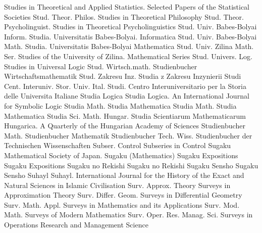 {Studies in Theoretical and Applied Statistics. Selected Papers of the Statistical Societies}
{Stud. Theor. Philos.}
{Studies in Theoretical Philosophy}
{Stud. Theor. Psycholinguist.}
{Studies in Theoretical Psycholinguistics}
{Stud. Univ. Babes-Bolyai Inform.}
{Studia. Universitatis Babes-Bolyai. Informatica}
{Stud. Univ. Babes-Bolyai Math.}
{Studia. Universitatis Babes-Bolyai Mathematica}
{Stud. Univ. Zilina Math. Ser.}
{Studies of the University of Zilina. Mathematical Series}
{Stud. Univers. Log.}
{Studies in Universal Logic}
{Stud. Wirtsch.math.}
{Studienbucher Wirtschaftsmathematik}
{Stud. Zakresu Inz.}
{Studia z Zakresu Inzynierii}
{Studi Cent. Interuniv. Stor. Univ. Ital.}
{Studi. Centro Interuniversitario per la Storia delle Universita Italiane}
{Studia Logica}
{Studia Logica. An International Journal for Symbolic Logic}
{Studia Math.}
{Studia Mathematica}
{Studia Math.}
{Studia Mathematica}
{Studia Sci. Math. Hungar.}
{Studia Scientiarum Mathematicarum Hungarica. A Quarterly of the Hungarian Academy of Sciences}
{Studienbucher Math.}
{Studienbucher Mathematik}
{Studienbucher Tech. Wiss.}
{Studienbucher der Technischen Wissenschaften}
{Subser. Control}
{Subseries in Control}
{Sugaku}
{Mathematical Society of Japan. Sugaku (Mathematics)}
{Sugaku Expositions}
{Sugaku Expositions}
{Sugaku no Rekishi}
{Sugaku no Rekishi}
{Sugaku Sensho}
{Sugaku Sensho}
{Suhayl}
{Suhayl. International Journal for the History of the Exact and Natural Sciences in Islamic Civilisation}
{Surv. Approx. Theory}
{Surveys in Approximation Theory}
{Surv. Differ. Geom.}
{Surveys in Differential Geometry}
{Surv. Math. Appl.}
{Surveys in Mathematics and its Applications}
{Surv. Mod. Math.}
{Surveys of Modern Mathematics}
{Surv. Oper. Res. Manag. Sci.}
{Surveys in Operations Research and Management Science}
